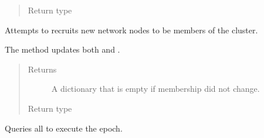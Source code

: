 \documentclass[letterpaper,10pt,english]{sphinxmanual}
\begin{document}
\begin{fulllineitems}
\begin{fulllineitems}
\begin{quote}
\begin{description}
\item[{Return type}] \leavevmode
{}

\end{description}\end{quote}

\end{fulllineitems}


\begin{fulllineitems}
\label{\detokenize{app.domain:app.domain.cluster_groups.Cluster.membership_maintenance}}
Attempts to recruits new network nodes to be members of the cluster.

The method updates both {\hyperref[\detokenize{app.domain:app.domain.cluster_groups.Cluster.members}]{}} and {\hyperref[\detokenize{app.domain:app.domain.cluster_groups.Cluster._members_view}]{}}.
\begin{quote}\begin{description}
\item[{Returns}] \leavevmode
A dictionary that is empty if membership did not change.

\item[{Return type}] \leavevmode
{\hyperref[\detokenize{app:app.type_hints.NodeDict}]{}}

\end{description}\end{quote}

\end{fulllineitems}


\begin{fulllineitems}
\label{\detokenize{app.domain:app.domain.cluster_groups.Cluster.nodes_execute}}
Queries all {\hyperref[\detokenize{app.domain:app.domain.cluster_groups.Cluster.members}]{}} to execute the epoch.


\end{fulllineitems}
\end{fulllineitems}
\end{document}
